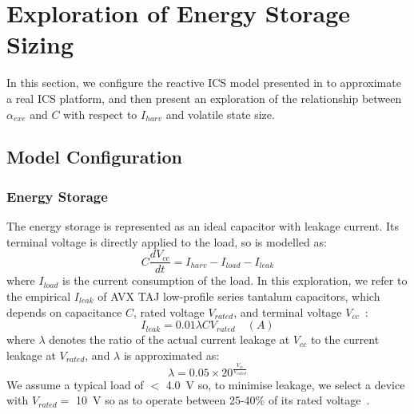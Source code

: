 
\section{Exploration of Energy Storage Sizing} \label{section:exploration}


In this section, we configure the reactive ICS model presented in  to approximate a real ICS platform, and then present an exploration of the relationship between $\alpha_{exe}$ and $C$ with respect to $I_{harv}$ and volatile state size.

\subsection{Model Configuration}

\subsubsection{Energy Storage}

The energy storage is represented as an ideal capacitor with leakage current. Its terminal voltage is directly applied to the load, so is modelled as:
\begin{equation}
  C \frac{dV_{cc}}{dt} = I_{harv} - I_{load} - I_{leak}
\end{equation}
where $I_{load}$ is the current consumption of the load. In this exploration, we refer to the empirical $I_{leak}$ of AVX TAJ low-profile series tantalum capacitors, which depends on capacitance $C$, rated voltage $V_{rated}$, and terminal voltage $V_{cc}$~\cite{avxleakage}:
\begin{equation}
    I_{leak} = 0.01 \lambda C V_{rated} \quad (A)
\end{equation}
where $\lambda$ denotes the ratio of the actual current leakage at $V_{cc}$ to the current leakage at $V_{rated}$, and $\lambda$ is approximated as: 
\begin{equation}
    \lambda = 0.05 \times 20^{\frac{V_{cc}}{V_{rated}}}
\end{equation}
We assume a typical load of $<$ \SI{4.0}{\volt} so, to minimise leakage, we select a device with $V_{rated} =$ \SI{10}{\volt} so as to operate between 25-40\% of its rated voltage~\cite{avxleakage}. 

